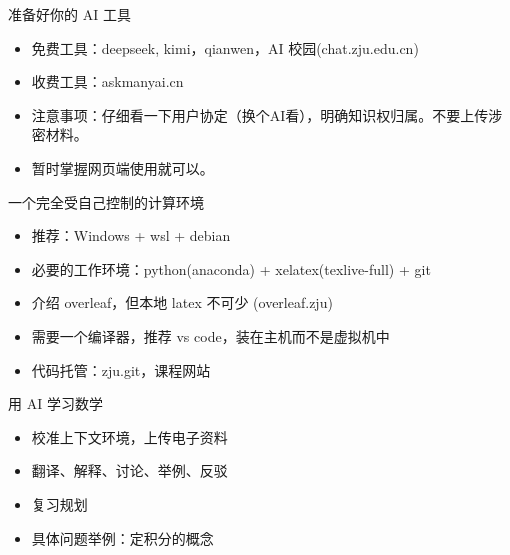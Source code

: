 \documentclass[10pt,aspectratio=169]{beamer}
\begin{document}
\begin{frame}{准备好你的 AI 工具}
    \begin{itemize}
        \item 免费工具：deepseek, kimi，qianwen，AI 校园(chat.zju.edu.cn)
        \item 收费工具：askmanyai.cn
        \item 注意事项：仔细看一下用户协定（换个AI看），明确知识权归属。不要上传涉密材料。
        \item 暂时掌握网页端使用就可以。
    \end{itemize}

\end{frame}

\begin{frame}{一个完全受自己控制的计算环境}
\begin{itemize}
    \item 推荐：Windows + wsl + debian
    \item 必要的工作环境：python(anaconda) + xelatex(texlive-full) + git
    \item 介绍 overleaf，但本地 latex 不可少 (overleaf.zju)
    \item 需要一个编译器，推荐 vs code，装在主机而不是虚拟机中
    \item 代码托管：zju.git，课程网站
\end{itemize}
\end{frame}

\begin{frame}{用 AI 学习数学}
  \begin{itemize}
    \item 校准上下文环境，上传电子资料
    \item 翻译、解释、讨论、举例、反驳
    \item 复习规划
    \item 具体问题举例：定积分的概念
  \end{itemize}
\end{frame}
\end{document}
